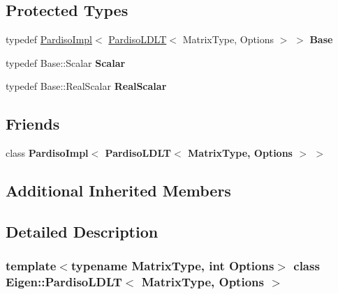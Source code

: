 \subsection*{Protected Types}
\begin{DoxyCompactItemize}
\item 
\mbox{\label{class_eigen_1_1_pardiso_l_d_l_t_a2b656497d36453d2638b6ec7522c1d39}} 
typedef \mbox{\hyperlink{class_eigen_1_1_pardiso_impl}{Pardiso\+Impl}}$<$ \mbox{\hyperlink{class_eigen_1_1_pardiso_l_d_l_t}{Pardiso\+L\+D\+LT}}$<$ Matrix\+Type, Options $>$ $>$ {\bfseries Base}
\item 
\mbox{\label{class_eigen_1_1_pardiso_l_d_l_t_a1185bbdb29c3fd4f89b28f09c559adee}} 
typedef Base\+::\+Scalar {\bfseries Scalar}
\item 
\mbox{\label{class_eigen_1_1_pardiso_l_d_l_t_a0f2b16e45d24849737bcf3bba02ca1c8}} 
typedef Base\+::\+Real\+Scalar {\bfseries Real\+Scalar}
\end{DoxyCompactItemize}
\subsection*{Friends}
\begin{DoxyCompactItemize}
\item 
\mbox{\label{class_eigen_1_1_pardiso_l_d_l_t_a47a1936c390c8845f892507eeeb25426}} 
class {\bfseries Pardiso\+Impl$<$ Pardiso\+L\+D\+L\+T$<$ Matrix\+Type, Options $>$ $>$}
\end{DoxyCompactItemize}
\subsection*{Additional Inherited Members}


\subsection{Detailed Description}
\subsubsection*{template$<$typename Matrix\+Type, int Options$>$\newline
class Eigen\+::\+Pardiso\+L\+D\+L\+T$<$ Matrix\+Type, Options $>$}

